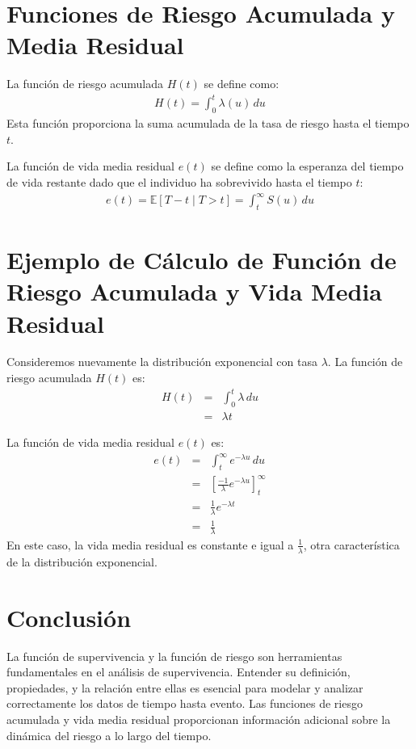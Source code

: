 \section{Funciones de Riesgo Acumulada y Media Residual}
La funci\'on de riesgo acumulada $H(t)$ se define como:
\begin{eqnarray*}
H(t) = \int_0^t \lambda(u) \, du
\end{eqnarray*}
Esta funci\'on proporciona la suma acumulada de la tasa de riesgo hasta el tiempo $t$.

La funci\'on de vida media residual $e(t)$ se define como la esperanza del tiempo de vida restante dado que el individuo ha sobrevivido hasta el tiempo $t$:
\begin{eqnarray*}
e(t) = \mathbb{E}[T - t \mid T > t] = \int_t^\infty S(u) \, du
\end{eqnarray*}

\section{Ejemplo de C\'alculo de Funci\'on de Riesgo Acumulada y Vida Media Residual}
Consideremos nuevamente la distribuci\'on exponencial con tasa $\lambda$. La funci\'on de riesgo acumulada $H(t)$ es:
\begin{eqnarray*}
H(t) &=& \int_0^t \lambda \, du \\
     &=& \lambda t
\end{eqnarray*}

La funci\'on de vida media residual $e(t)$ es:
\begin{eqnarray*}
e(t) &=& \int_t^\infty e^{-\lambda u} \, du \\
     &=& \left[ \frac{-1}{\lambda} e^{-\lambda u} \right]_t^\infty \\
     &=& \frac{1}{\lambda} e^{-\lambda t} \\
     &=& \frac{1}{\lambda}
\end{eqnarray*}
En este caso, la vida media residual es constante e igual a $\frac{1}{\lambda}$, otra caracter\'istica de la distribuci\'on exponencial.

\section{Conclusi\'on}
La funci\'on de supervivencia y la funci\'on de riesgo son herramientas fundamentales en el an\'alisis de supervivencia. Entender su definici\'on, propiedades, y la relaci\'on entre ellas es esencial para modelar y analizar correctamente los datos de tiempo hasta evento. Las funciones de riesgo acumulada y vida media residual proporcionan informaci\'on adicional sobre la din\'amica del riesgo a lo largo del tiempo.

